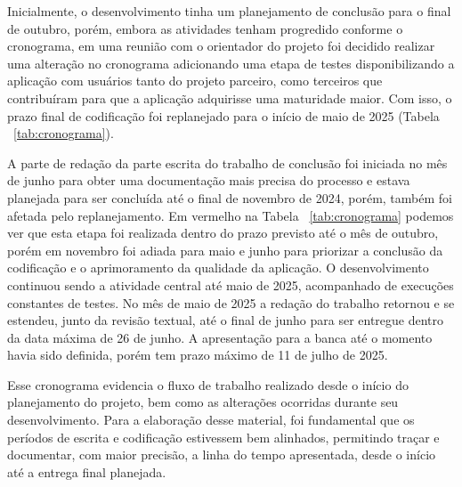 Inicialmente, o desenvolvimento tinha um planejamento de conclusão para o final de outubro, porém, embora as atividades tenham progredido conforme o cronograma, em uma reunião com o orientador do projeto foi decidido realizar uma alteração no cronograma adicionando uma etapa de testes disponibilizando a aplicação com 
usuários tanto do projeto parceiro, como terceiros que contribuíram para que a aplicação adquirisse uma maturidade maior. Com isso, o prazo final de codificação foi replanejado para o início de maio de 2025 (Tabela ~\ref{tab:cronograma}).

A parte de redação da parte escrita do trabalho de conclusão foi iniciada no mês de junho para obter uma documentação mais precisa do processo e estava planejada para ser concluída até o final de novembro de 2024, porém, também foi afetada pelo replanejamento. Em vermelho na Tabela ~\ref{tab:cronograma} podemos ver que esta etapa foi realizada dentro do prazo previsto até o mês de outubro, porém em novembro foi adiada para maio e junho para priorizar a conclusão da codificação e o aprimoramento da qualidade da aplicação. O desenvolvimento continuou sendo a atividade central até maio de 2025, acompanhado de execuções constantes de testes. No mês de maio de 2025 a redação do trabalho retornou e se estendeu, junto da revisão textual, até o final de junho para ser entregue dentro da data máxima de 26 de junho. A apresentação para a banca até o momento havia sido definida, porém tem prazo máximo de 11 de julho de 2025.

Esse cronograma evidencia o fluxo de trabalho realizado desde o início do planejamento do projeto, bem como as alterações ocorridas durante seu desenvolvimento. Para a elaboração desse material, foi fundamental que os períodos de escrita e codificação estivessem bem alinhados, permitindo traçar e documentar, com maior precisão, a linha do tempo apresentada, desde o início até a entrega final planejada.

